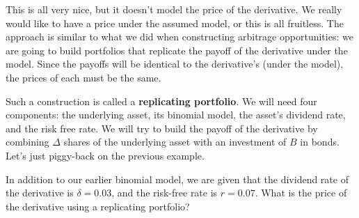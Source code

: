 \documentclass{ximera}
\begin{document}
This is all very nice, but it doesn't model the price of the derivative. We really would like to have a price under the assumed model, or this is all fruitless. The approach is similar to what we did when constructing arbitrage opportunities: we are going to build portfolios that replicate the payoff of the derivative under the model. Since the payoffs will be identical to the derivative's (under the model), the prices of each must be the same.

Such a construction is called a {\bf replicating portfolio}. We will need four components: the underlying asset, its binomial model, the asset's dividend rate, and the risk free rate. We will try to build the payoff of the derivative by combining $\Delta$ shares of the underlying asset with an investment of $B$ in bonds. Let's just piggy-back on the previous example. 

\begin{example}
In addition to our earlier binomial model, we are given that the dividend rate of the derivative is $\delta=0.03$, and the risk-free rate is $r=0.07$. What is the price of the derivative using a replicating portfolio?
\end{example}
\end{document}
